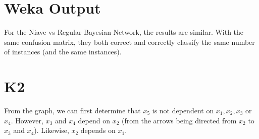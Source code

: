 \documentclass[12pt]{scrartcl}
\begin{document}
\section{Weka Output}
\begin{figure}[H]
    \centering
\end{figure}

For the Niave vs Regular Bayesian Network, the results are similar. With the same confusion matrix, they both correct and correctly classify the same number of instances (and the same instances).

\section{K2}
From the graph, we can first determine that $x_5$ is not dependent on $x_1, x_2, x_3$ or $x_4$. However, $x_3$ and $x_4$ depend on $x_2$ (from the arrows being directed from $x_2$ to $x_3$ and $x_4$). Likewise, $x_2$ depends on $x_1$.
\end{document}

